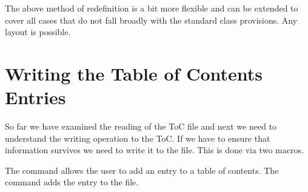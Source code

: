 The above method of redefinition is a bit more flexible and can be extended to cover all cases that do not fall broadly with the standard class provisions. Any layout is possible.


\section{Writing the Table of Contents Entries}

So far we have examined the reading of the ToC file and next we need to understand the writing operation
to the ToC. If we have to ensure that information survives we need to write it to the file. This is done via two macros.


\begin{macro}{\addcontentsline}
The  command allows the user to add an entry to a table of contents. The command adds the entry
 to the  file.
\end{macro}



\begin{teX}       
 \long{}
\end{teX}

\begin{teX}
\def\addcontentsline#1#2#3{%
  \addtocontents{#1}{\protect\contentsline{#2}{#3}{\thepage}}}

\def\contentsline#1{\csname l@#1\endcsname}
\end{teX}



